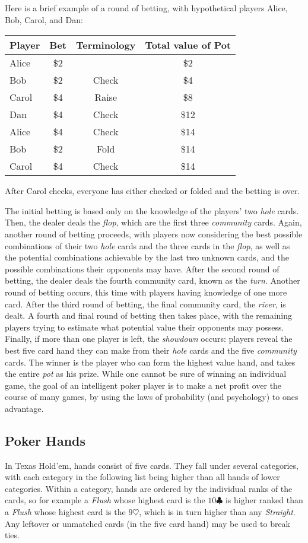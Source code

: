 \begin{enumerate}
Here is a brief example of a round of betting, with hypothetical
players Alice, Bob, Carol, and Dan:
\begin{table}[h]
  \centering
  \begin{tabular}{ l || c | c | c}
    \hline
    Player & Bet & Terminology & Total value of Pot \\
    \hline
    Alice & \$2 &  & \$2 \\
    Bob & \$2 & Check & \$4 \\
    Carol & \$4 & Raise & \$8 \\
    Dan & \$4 & Check & \$12 \\
    Alice & \$4 & Check & \$14 \\
    Bob & \$2 & Fold & \$14 \\
    Carol & \$4 & Check & \$14 \\
  \end{tabular}
\end{table}
After Carol checks, everyone has either checked or folded and the
betting is over.

The initial betting is based only on the knowledge of the players' two
\emph{hole} cards. Then, the dealer deals the \emph{flop}, which are
the first three \emph{community} cards. Again, another round of
betting proceeds, with players now considering the best possible
combinations of their two \emph{hole} cards and the three cards in the
\emph{flop}, as well as the potential combinations achievable by the
last two unknown cards, and the possible combinations their opponents
may have. After the second round of betting, the dealer deals the
fourth community card, known as the \emph{turn}. Another round of
betting occurs, this time with players having knowledge of one more
card. After the third round of betting, the final community card, the
\emph{river}, is dealt. A fourth and final round of betting then takes
place, with the remaining players trying to estimate what potential
value their opponents may possess. Finally, if more than one player is
left, the \emph{showdown} occurs: players reveal the best five card
hand they can make from their \emph{hole} cards and the five
\emph{community} cards. The winner is the player who can form the
highest value hand, and takes the entire \emph{pot} as his
prize. While one cannot be sure of winning an individual game, the
goal of an intelligent poker player is to make a net profit over the
course of many games, by using the laws of probability (and
psychology) to ones advantage.

\subsection{Poker Hands}
In Texas Hold'em, hands consist of five cards. They fall under several
categories, with each category in the following list being higher than
all hands of lower categories. Within a category, hands are ordered by
the individual ranks of the cards, so for example a \emph{Flush} whose
highest card is the $10\clubsuit$ is higher ranked than a \emph{Flush}
whose highest card is the $9\heartsuit$, which is in turn higher than
any \emph{Straight}. Any leftover or unmatched cards (in the five card
hand) may be used to break ties.


\end{enumerate}
